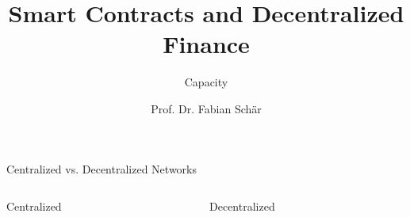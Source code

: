 \documentclass[handout]{beamer}
\title{Smart Contracts and Decentralized Finance}
\subtitle{Capacity}
\author{Prof. Dr. Fabian Schär}
\institute{University of Basel}
\begin{document}
\thispagestyle{empty}
\begin{frame}[noframenumbering]
	\titlepage
\end{frame}


\begin{frame}{Centralized vs. Decentralized Networks}
	\begin{columns}
		\begin{column}{0.5\textwidth}
			\begin{center}
				Centralized
			\end{center}
		\end{column}
		\begin{column}{0.5\textwidth}
			\begin{center}
				Decentralized
			\end{center}
		\end{column}
	\end{columns}
	\vspace{.8 cm}
	\begin{columns}[T]
		\begin{column}{0.5\textwidth}
			\begin{tikzpicture}[scale=0.7, every node/.style={scale=0.7}]
				
			\end{tikzpicture}
		\end{column}
		\begin{column}{0.5\textwidth}
			\begin{tikzpicture}[scale=0.7, every node/.style={scale=0.7}]
				
				
			\end{tikzpicture}
		\end{column}
	\end{columns}
\end{frame}
\end{document}
